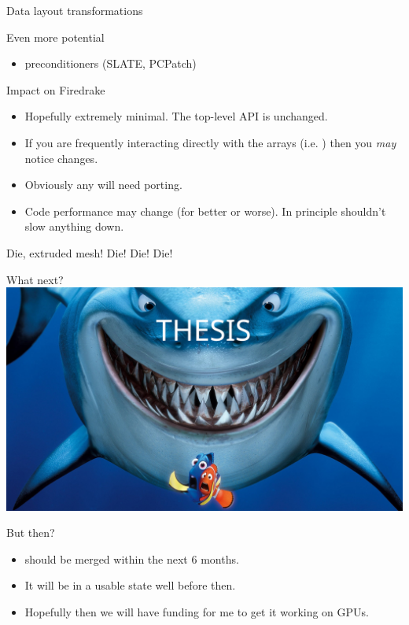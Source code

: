 \documentclass[aspectratio=169]{beamer}
\begin{document}
\begin{frame}{Data layout transformations}
\end{frame}

\begin{frame}{Even more potential}
  \begin{itemize}
    \item
      preconditioners (SLATE, PCPatch)
  \end{itemize}
\end{frame}

\begin{frame}{Impact on Firedrake}
  \begin{itemize}
    \item
      Hopefully extremely minimal. The top-level API is unchanged.
    \item
      If you are frequently interacting directly with the arrays (i.e. ) then you \emph{may} notice changes.
    \item
      Obviously any  will need porting.
    \item
      Code performance may change (for better or worse).
      In principle shouldn't slow anything down.
  \end{itemize}
\end{frame}

\begin{frame}{Die, extruded mesh! Die! Die! Die!}
\end{frame}

\begin{frame}{What next?}
  \pause
  \vspace{-3em}
  \includegraphics[width=\textwidth]{shark.png}
\end{frame}

\begin{frame}{But then?}
  \begin{itemize}
    \item
       should be merged within the next 6 months.
    \item
      It will be in a usable state well before then.
    \item
      Hopefully then we will have funding for me to get it working on GPUs.
  \end{itemize}
\end{frame}
\end{document}
